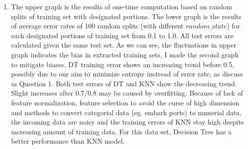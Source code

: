\documentclass[11pt]{article}
\begin{document}
\begin{enumerate}[label=(\alph*)]
    \item
    The upper graph is the results of one-time computation based on random splits of training set with designated portions. The lower graph is the results of average error rates of 100 random splits (with different $random\_state$) for each designated portions of training set from 0.1 to 1.0. All test errors are calculated given the same test set. As we can see, the fluctuations in upper graph indicates the bias in extracted training sets, I made the second graph to mitigate biases. DT training error shows an increasing trend before 0.5, possibly due to our aim to minimize entropy instread of error rate, as discuss in Question 1. Both test errors of DT and KNN show the decreasing trend. Slight increases after 0.7/0.8 may be caused by overfitting. Because of lack of feature normalization, feature selection to avoid the curse of high dimension and methods to convert categorial data (eg. embark ports) to numerial data, the incoming data are noisy and the training errors of KNN stay high despite increasing amount of training data. For this data set, Decision Tree has a better performance than KNN model.
    \\
    \\
    \\




\end{enumerate}
\end{document}
